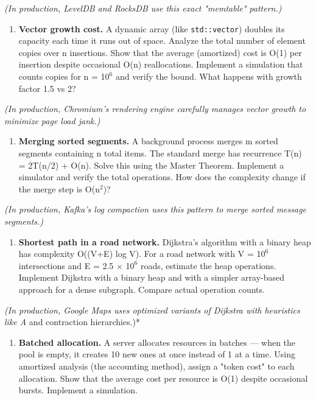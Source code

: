    \textit{(In production, LevelDB and RocksDB use this exact "memtable" pattern.)}

\begin{enumerate}
\item \textbf{Vector growth cost.} A dynamic array (like \texttt{std::vector}) doubles its capacity each time it runs out of space. Analyze the total number of element copies over n insertions. Show that the average (amortized) cost is O(1) per insertion despite occasional O(n) reallocations. Implement a simulation that counts copies for n = 1$0^{6}$ and verify the bound. What happens with growth factor 1.5 vs 2?
\end{enumerate}

   \textit{(In production, Chromium's rendering engine carefully manages vector growth to minimize page load jank.)}

\begin{enumerate}
\item \textbf{Merging sorted segments.} A background process merges m sorted segments containing n total items. The standard merge has recurrence T(n) = 2T(n/2) + O(n). Solve this using the Master Theorem. Implement a simulator and verify the total operations. How does the complexity change if the merge step is O(n$^{2}$)?
\end{enumerate}

   \textit{(In production, Kafka's log compaction uses this pattern to merge sorted message segments.)}

\begin{enumerate}
\item \textbf{Shortest path in a road network.} Dijkstra's algorithm with a binary heap has complexity O((V+E) log V). For a road network with V = 1$0^{6}$ intersections and E = 2.5 $\times $ 1$0^{6}$ roads, estimate the heap operations. Implement Dijkstra with a binary heap and with a simpler array-based approach for a dense subgraph. Compare actual operation counts.
\end{enumerate}

   \textit{(In production, Google Maps uses optimized variants of Dijkstra with heuristics like A} and contraction hierarchies.)*

\begin{enumerate}
\item \textbf{Batched allocation.} A server allocates resources in batches — when the pool is empty, it creates 10 new ones at once instead of 1 at a time. Using amortized analysis (the accounting method), assign a "token cost" to each allocation. Show that the average cost per resource is O(1) despite occasional bursts. Implement a simulation.
\end{enumerate}

